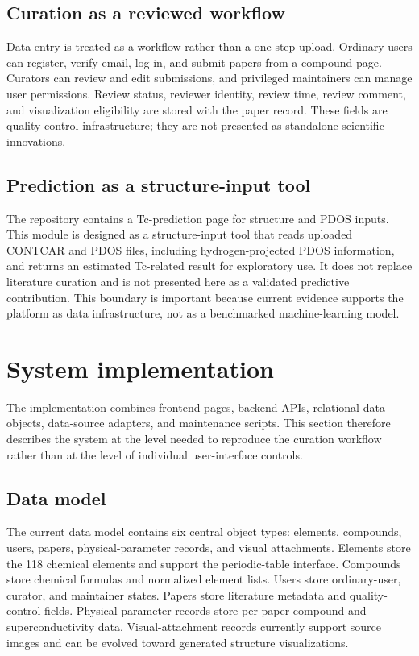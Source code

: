 \documentclass[11pt,a4paper]{article}
\begin{document}
\subsection{Curation as a reviewed workflow}

Data entry is treated as a workflow rather than a one-step upload. Ordinary users can register, verify email, log in, and submit papers from a compound page. Curators can review and edit submissions, and privileged maintainers can manage user permissions. Review status, reviewer identity, review time, review comment, and visualization eligibility are stored with the paper record. These fields are quality-control infrastructure; they are not presented as standalone scientific innovations.

\subsection{Prediction as a structure-input tool}

The repository contains a Tc-prediction page for structure and PDOS inputs. This module is designed as a structure-input tool that reads uploaded CONTCAR and PDOS files, including hydrogen-projected PDOS information, and returns an estimated Tc-related result for exploratory use. It does not replace literature curation and is not presented here as a validated predictive contribution. This boundary is important because current evidence supports the platform as data infrastructure, not as a benchmarked machine-learning model.

\section{System implementation}

The implementation combines frontend pages, backend APIs, relational data objects, data-source adapters, and maintenance scripts. This section therefore describes the system at the level needed to reproduce the curation workflow rather than at the level of individual user-interface controls.

\subsection{Data model}

The current data model contains six central object types: elements, compounds, users, papers, physical-parameter records, and visual attachments. Elements store the 118 chemical elements and support the periodic-table interface. Compounds store chemical formulas and normalized element lists. Users store ordinary-user, curator, and maintainer states. Papers store literature metadata and quality-control fields. Physical-parameter records store per-paper compound and superconductivity data. Visual-attachment records currently support source images and can be evolved toward generated structure visualizations.
\end{document}
